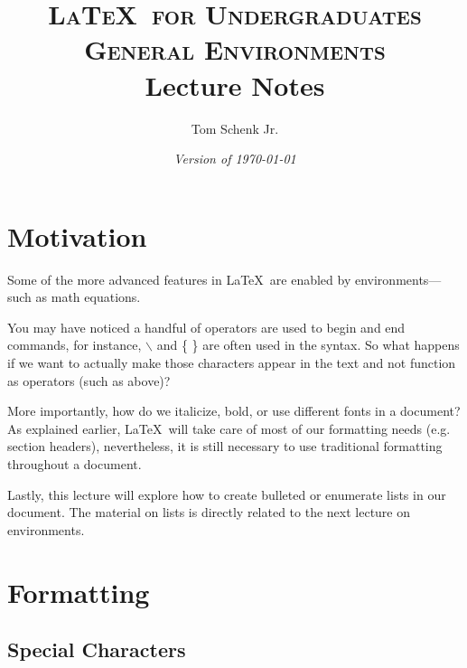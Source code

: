 \documentclass{article}
\title{\textsc{\LaTeX\ for Undergraduates\\
			General Environments} \\
			Lecture Notes}
\author{Tom Schenk Jr.}		%
\date{\textit{Version of \today}}
\begin{document}
\maketitle

\section{Motivation}

Some of the more advanced features in \LaTeX\ are enabled by environments---such as math equations. 

You may have noticed a handful of operators are used to begin and end commands, for instance, \texttt{$\backslash$} and \{ \} are often used in the syntax. So what happens if we want to actually make those characters appear in the text and not function as operators (such as above)?

More importantly, how do we italicize, bold, or use different fonts in a document? As explained earlier, \LaTeX\ will take care of most of our formatting needs (e.g. section headers), nevertheless, it is still necessary to use traditional formatting throughout a document.

Lastly, this lecture will explore how to create bulleted or enumerate lists in our document. The material on lists is directly related to the next lecture on environments.

\section{Formatting}

\subsection{Special Characters}
\end{document}
